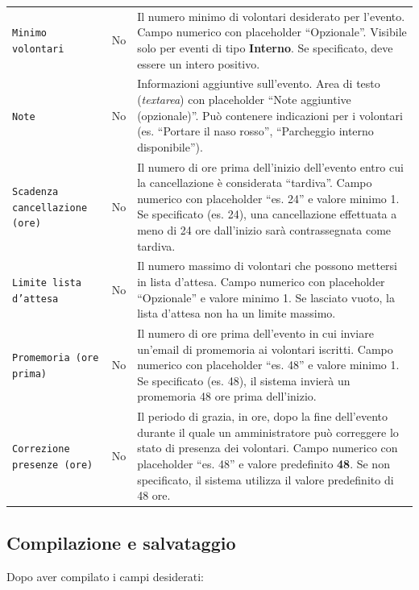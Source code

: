 \documentclass[a4paper,11pt,oneside]{book}
\newcommand{\campo}[1]{\texttt{#1}}
\begin{document}
\begin{longtable}{l l p{7.5cm}}
\campo{Minimo volontari} & No & Il numero minimo di volontari desiderato per l'evento. Campo numerico con placeholder ``Opzionale''. Visibile solo per eventi di tipo \textbf{Interno}. Se specificato, deve essere un intero positivo. \\[6pt]

\campo{Note} & No & Informazioni aggiuntive sull'evento. Area di testo (\textit{textarea}) con placeholder ``Note aggiuntive (opzionale)''. Pu\`o contenere indicazioni per i volontari (es. ``Portare il naso rosso'', ``Parcheggio interno disponibile''). \\[6pt]

\campo{Scadenza cancellazione (ore)} & No & Il numero di ore prima dell'inizio dell'evento entro cui la cancellazione \`e considerata ``tardiva''. Campo numerico con placeholder ``es. 24'' e valore minimo 1. Se specificato (es. 24), una cancellazione effettuata a meno di 24 ore dall'inizio sar\`a contrassegnata come tardiva. \\[6pt]

\campo{Limite lista d'attesa} & No & Il numero massimo di volontari che possono mettersi in lista d'attesa. Campo numerico con placeholder ``Opzionale'' e valore minimo 1. Se lasciato vuoto, la lista d'attesa non ha un limite massimo. \\[6pt]

\campo{Promemoria (ore prima)} & No & Il numero di ore prima dell'evento in cui inviare un'email di promemoria ai volontari iscritti. Campo numerico con placeholder ``es. 48'' e valore minimo 1. Se specificato (es. 48), il sistema invier\`a un promemoria 48 ore prima dell'inizio. \\[6pt]

\campo{Correzione presenze (ore)} & No & Il periodo di grazia, in ore, dopo la fine dell'evento durante il quale un amministratore pu\`o correggere lo stato di presenza dei volontari. Campo numerico con placeholder ``es. 48'' e valore predefinito \textbf{48}. Se non specificato, il sistema utilizza il valore predefinito di 48 ore. \\
\bottomrule
\end{longtable}

\subsection{Compilazione e salvataggio}

Dopo aver compilato i campi desiderati:
\end{document}
